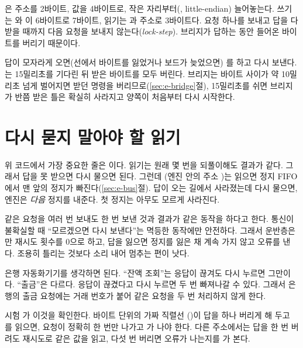 은 주소를 2바이트, 값을 4바이트로, 작은 자리부터(\code{<}, little-endian)
늘어놓는다. 쓰기는 와 이 6바이트로 7바이트, 읽기는 과 주소로 3바이트다. 요청 하나를 보내고 답을
다 받을 때까지 다음 요청을 보내지 않는다(\emph{lock-step}). 브리지가 답하는 동안 들어온 바이트를 버리기 때문이다.

답이 모자라게 오면(선에서 바이트를 잃었거나 보드가 늦었으면) 를 하고 다시 보낸다. 는
15밀리초를 기다린 뒤 받은 바이트를 모두 버린다. 브리지는 바이트 사이가 약 10밀리초 넘게 벌어지면 받던 명령을
버리므로(\ref{sec:e-bridge}절), 15밀리초를 쉬면 브리지가 반쯤 받은 틀은 확실히 사라지고 양쪽이 처음부터 다시
시작한다.

\section{다시 묻지 말아야 할 읽기}\label{sec:h-idempotent}

위 코드에서 가장 중요한 줄은 이다. 읽기는 원래 몇 번을 되풀이해도 결과가 같다. 그래서 답을
못 받으면 다시 물으면 된다. 그런데 (엔진 안의 주소 )는 읽으면 정지 FIFO에서 맨 앞의
정지가 빠진다(\ref{sec:e-bus}절). 답이 오는 길에서 사라졌는데 다시 물으면, 엔진은 \emph{다음} 정지를 내준다.
첫 정지는 아무도 모르게 사라진다.

\Why 같은 요청을 여러 번 보내도 한 번 보낸 것과 결과가 같은 동작을 하다고 한다. 통신이
불확실할 때 ``모르겠으면 다시 보낸다''는 멱등한 동작에만 안전하다. 그래서 운반층은 만 재시도
횟수를 0으로 하고, 답을 잃으면 정지를 잃은 채 계속 가지 않고 오류를 낸다. 조용히 틀리는 것보다 소리 내어 멈추는
편이 낫다.

\General 은행 자동화기기를 생각하면 된다. ``잔액 조회''는 응답이 끊겨도 다시 누르면 그만이다. ``출금''은 다르다.
응답이 끊겼다고 다시 누르면 두 번 빠져나갈 수 있다. 그래서 은행의 출금 요청에는 거래 번호가 붙어 같은 요청을
두 번 처리하지 않게 한다.

\Ours 시험 가 이것을 확인한다. 바이트 단위의 가짜 직렬선
()이 답을 하나 버리게 해 두고 를 읽으면, 요청이 정확히 한 번만 나가고
가 나야 한다. 다른 주소에서는 답을 한 번 버려도 재시도로 같은 값을 읽고, 다섯 번 버리면
오류가 나는지를 가 본다.

